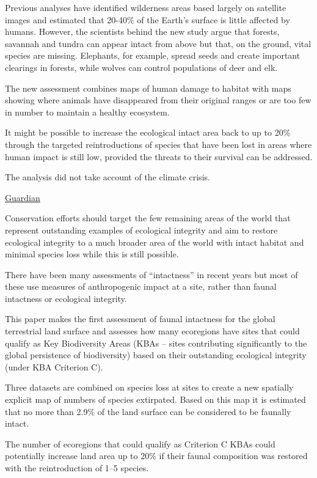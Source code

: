 \documentclass[
]{book}
\begin{document}
Previous analyses have identified wilderness areas based largely on satellite images and estimated that 20-40\% of the Earth's surface is little affected by humans. However, the scientists behind the new study argue that forests, savannah and tundra can appear intact from above but that, on the ground, vital species are missing. Elephants, for example, spread seeds and create important clearings in forests, while wolves can control populations of deer and elk.

The new assessment combines maps of human damage to habitat with maps showing where animals have disappeared from their original ranges or are too few in number to maintain a healthy ecosystem.

It might be possible to increase the ecological intact area back to up to 20\% through the targeted reintroductions of species that have been lost in areas where human impact is still low, provided the threats to their survival can be addressed.

The analysis did not take account of the climate crisis.

\href{https://www.theguardian.com/environment/2021/apr/15/just-3-of-worlds-ecosystems-remain-intact-study-suggests}{Guardian}

Conservation efforts should target the few remaining areas of the world that represent
outstanding examples of ecological integrity and aim to restore ecological integrity to
a much broader area of the world with intact habitat and minimal species loss while
this is still possible.

There have been many assessments of ``intactness'' in recent
years but most of these use measures of anthropogenic impact at a site, rather than
faunal intactness or ecological integrity.

This paper makes the first assessment of faunal
intactness for the global terrestrial land surface and assesses how many ecoregions
have sites that could qualify as Key Biodiversity Areas (KBAs -- sites contributing
significantly to the global persistence of biodiversity) based on their outstanding
ecological integrity (under KBA Criterion C).

Three datasets are combined on species
loss at sites to create a new spatially explicit map of numbers of species extirpated.
Based on this map it is estimated that no more than 2.9\% of the land surface can be
considered to be faunally intact.

The number of ecoregions that
could qualify as Criterion C KBAs could potentially increase land area up to 20\% if
their faunal composition was restored with the reintroduction of 1--5 species.
\end{document}
